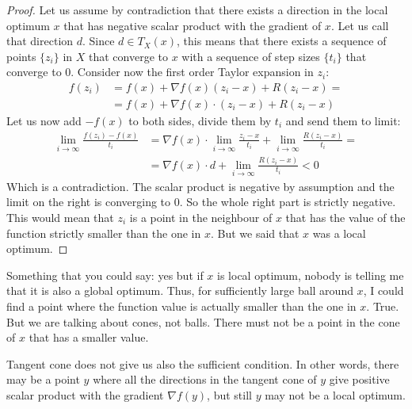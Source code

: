 \begin{proof}
    Let us assume by contradiction that there exists a direction in the local optimum $x$ that has negative scalar product with the gradient of $x$. Let us call that direction $d$. Since $d \in T_X(x)$, this means that there exists a sequence of points $\{z_i\}$ in $X$ that converge to $x$ with a sequence of step sizes $\{t_i\}$ that converge to 0. Consider now the first order Taylor expansion in $z_i$:
    \begin{equation}
        \begin{split}
            f(z_i) &= f(x) + \nabla f(x)(z_i - x) + R(z_i - x) =\\
            &= f(x) + \nabla f(x) \cdot (z_i - x) + R(z_i - x)
        \end{split}
    \end{equation}
    Let us now add $-f(x)$ to both sides, divide them by $t_i$ and send them to limit:
    \begin{equation}
        \begin{split}
            \lim_{i \rightarrow \infty} \frac{f(z_i) - f(x)}{t_i} &= \nabla f(x) \cdot \lim_{i \rightarrow \infty} \frac{z_i - x}{t_i} + \lim_{i \rightarrow \infty} \frac{R(z_i - x)}{t_i} =\\
            &=\nabla f(x) \cdot   d + \lim_{i \rightarrow \infty} \frac{R(z_i - x)}{t_i} < 0
        \end{split}
    \end{equation}
    Which is a contradiction. The scalar product is negative by assumption and the limit on the right is converging to 0. So the whole right part is strictly negative. This would mean that $z_i$ is a point in the neighbour of $x$ that has the value of the function strictly smaller than the one in $x$. But we said that $x$ was a local optimum.
\end{proof}
\par Something that you could say: yes but if $x$ is local optimum, nobody is telling me that it is also a global optimum. Thus, for sufficiently large ball around $x$, I could find a point where the function value is actually smaller than the one in $x$. True. But we are talking about cones, not balls. There must not be a point in the cone of $x$ that has a smaller value.
\par Tangent cone does not give us also the sufficient condition. In other words, there may be a point $y$ where all the directions in the tangent cone of $y$ give positive scalar product with the gradient $\nabla f(y)$, but still $y$ may not be a local optimum.

